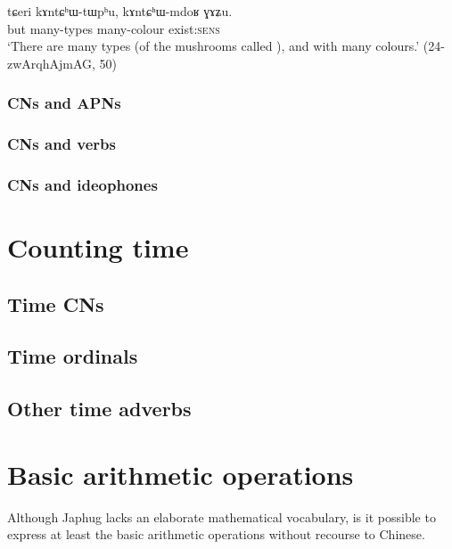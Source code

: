 \begin{exe}
\ex \label{ex:kAntChWmdoR}
 \gll  tɕeri kɤntɕʰɯ-tɯpʰu, kɤntɕʰɯ-mdoʁ ɣɤʑu. \\
 but many-types many-colour exist:\textsc{sens} \\
\glt  `There are many types (of the mushrooms called ), and with many colours.' (24-zwArqhAjmAG, 50)
\end{exe}

\subsubsection{CNs and APNs}   \label{sec:CN.APN}
\subsubsection{CNs and verbs}   \label{sec:CN.verbs}
\subsubsection{CNs and ideophones}   \label{sec:CN.ideophones}
\section{Counting time} \label{sec:time}
\subsection{Time CNs} \label{sec:CN.time}
 
\subsection{Time ordinals} \label{sec:time.ordinals}

\subsection{Other time adverbs} \label{sec:time.adverbs}
\section{Basic arithmetic operations} \label{sec:arithmetic}

Although Japhug lacks an elaborate mathematical vocabulary, is it possible to express at least the basic arithmetic operations without recourse to Chinese. 


